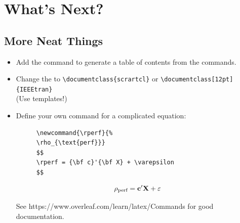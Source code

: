\documentclass[aspectratio=169]{beamer}
\begin{document}

\section{What's Next?}


\subsection{More Neat Things}
\begin{frame}[fragile]{\insertsubsection}
\begin{itemize}
\item Add the  command to generate a table of contents
from the  commands.

\item Change the  to
\verb|\documentclass{scrartcl}|
or
\verb|\documentclass[12pt]{IEEEtran}|\\
(Use templates!)

\item Define your own command for a complicated equation:
\begin{figure}
    \begin{minipage}{0.5\textwidth}
        \begin{lstlisting}          
\newcommand{\rperf}{%
\rho_{\text{perf}}}
$$
\rperf = {\bf c}'{\bf X} + \varepsilon
$$
        \end{lstlisting}
    \end{minipage}
    \begin{minipage}{0.4\textwidth}      
\newcommand{\rperf}{%
\rho_{\text{perf}}}
$$
\rperf = {\bf c}'{\bf X} + \varepsilon
$$
    \end{minipage}
\end{figure}
See https://www.overleaf.com/learn/latex/Commands for good documentation.
\end{itemize}
\end{frame}
\end{document}
